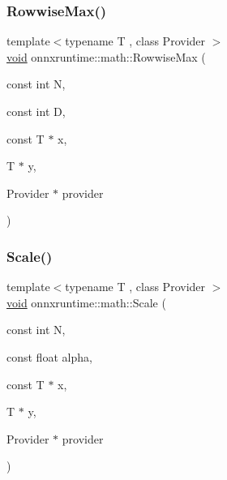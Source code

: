 \mbox{\label{namespaceonnxruntime_1_1math_a14e1e8d9851a45b734793f3424949e35}} 
\subsubsection{\texorpdfstring{Rowwise\+Max()}{RowwiseMax()}}
{\footnotesize\ttfamily template$<$typename T , class Provider $>$ \\
\mbox{\hyperlink{mlasi_8h_a88f941d423cb2a819b70a1358982b1a6}{void}} onnxruntime\+::math\+::\+Rowwise\+Max (\begin{DoxyParamCaption}\item[{const int}]{N,  }\item[{const int}]{D,  }\item[{const T $\ast$}]{x,  }\item[{T $\ast$}]{y,  }\item[{Provider $\ast$}]{provider }\end{DoxyParamCaption})}

\mbox{\label{namespaceonnxruntime_1_1math_a44a64e166d586dc38223073f901a46f6}} 
\subsubsection{\texorpdfstring{Scale()}{Scale()}\hspace{0.1cm}{\footnotesize\ttfamily [1/2]}}
{\footnotesize\ttfamily template$<$typename T , class Provider $>$ \\
\mbox{\hyperlink{mlasi_8h_a88f941d423cb2a819b70a1358982b1a6}{void}} onnxruntime\+::math\+::\+Scale (\begin{DoxyParamCaption}\item[{const int}]{N,  }\item[{const float}]{alpha,  }\item[{const T $\ast$}]{x,  }\item[{T $\ast$}]{y,  }\item[{Provider $\ast$}]{provider }\end{DoxyParamCaption})}

\mbox{\label{namespaceonnxruntime_1_1math_a7078112ac4cc580d30d9bd68577cd853}} 
